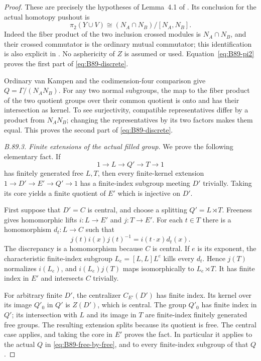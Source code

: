 \begin{proof}
These are precisely the hypotheses of Lemma~4.1 of
\citet[p.~320]{BBrownLoday1987}. Its conclusion for the actual
homotopy pushout is
\begin{equation}\label{eq:B89-crossed}
 \pi _2(Y\cup V)\cong (N_A\cap N_B)/[N_A,N_B].
\end{equation}
Indeed the fiber product of the two inclusion crossed modules is
$N_A\cap N_B$, and their crossed commutator is the ordinary mutual
commutator; this identification is also explicit in
\citet[Propositions~2.5 and~2.8]{BBrown1984}. No asphericity of $Z$
is assumed or used. Equation~\eqref{eq:B89-pi2} proves the first
part of \eqref{eq:B89-discrete}.

Ordinary van Kampen and the codimension-four comparison give
$Q=\Gamma/(N_A N_B)$. For any two normal subgroups, the map to
the fiber product of the two quotient groups over their common
quotient is onto and has their intersection as kernel. To see
surjectivity, compatible representatives differ by a product from
$N_A N_B$; changing the representatives by its two factors makes
them equal. This proves the second part of
\eqref{eq:B89-discrete}.

\emph{B.89.3. Finite extensions of the actual filled group.}
We prove the following elementary fact. If
\[
 1\longrightarrow L\longrightarrow Q'\longrightarrow T
       \longrightarrow1
\]
has finitely generated free $L,T$, then every finite-kernel extension
$1\to D'\to E'\to Q'\to1$ has a finite-index subgroup meeting
$D'$ trivially. Taking its core yields a finite quotient of $E'$
which is injective on $D'$.

First suppose that $D'=C$ is central, and choose a splitting
$Q'=L\rtimes T$. Freeness gives homomorphic lifts
$i:L\to E'$ and $j:T\to E'$. For each $t\in T$ there is a
homomorphism $d_t:L\to C$ such that
\begin{equation}\label{eq:B89-mismatch}
 j(t)i(x)j(t)^{-1}=i(t\cdot x)d_t(x).
\end{equation}
The discrepancy is a homomorphism because $C$ is central. If $e$
is its exponent, the characteristic finite-index subgroup
$L_e=[L,L]L^e$ kills every $d_t$. Hence $j(T)$ normalizes $i(L_e)$,
and $i(L_e)j(T)$ maps isomorphically to $L_e\rtimes T$. It has
finite index in $E'$ and intersects $C$ trivially.

For arbitrary finite $D'$, the centralizer $C_{E'}(D')$ has finite
index. Its kernel over its image $Q'_0$ in $Q'$ is $Z(D')$, which
is central. The group $Q'_0$ has finite index in $Q'$; its intersection
with $L$ and its image in $T$ are finite-index finitely generated
free groups. The resulting extension splits because its quotient
is free. The central case applies, and taking the core in $E'$
proves the fact. In particular it applies to the actual $Q$ in
\eqref{eq:B89-free-by-free}, and to every finite-index subgroup
of that $Q$.


\end{proof}
